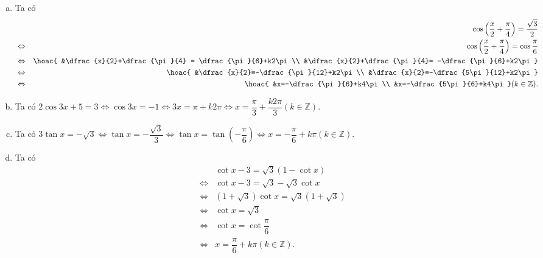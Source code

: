 \begin{ex}
{\begin{enumerate}[a)]
\begin{eqnarray*}
				      &\Leftrightarrow&
				      \hoac{&x=-\dfrac{5}{36}+\dfrac{k2\pi}{3}\\
					      &x=\dfrac{11\pi}{36}+\dfrac{k2\pi}{3}} (k\in \mathbb{Z}).
			      \end{eqnarray*}
			\item Ta có
			      \begin{eqnarray*}
				      &&\cos \left(\dfrac{x}{2}+\dfrac{\pi}{4}\right) =\dfrac{\sqrt{3}}{2} \\ &\Leftrightarrow& \cos \left(\dfrac{x}{2}+\dfrac{\pi}{4}\right)=\cos \dfrac{\pi}{6}\\
				      &\Leftrightarrow& \hoac{
					      &\dfrac{x}{2}+\dfrac{\pi}{4} = \dfrac{\pi}{6}+k2\pi\\
					      &\dfrac{x}{2}+\dfrac{\pi}{4}= -\dfrac{\pi}{6}+k2\pi}\\
				      &\Leftrightarrow&
				      \hoac{
					      &\dfrac{x}{2}=-\dfrac{\pi}{12}+k2\pi\\
					      &\dfrac{x}{2}=-\dfrac{5\pi}{12}+k2\pi}\\
				      &\Leftrightarrow&
				      \hoac{
					      &x=-\dfrac{\pi}{6}+k4\pi\\
					      &x=-\dfrac{5\pi}{6}+k4\pi} (k\in \mathbb{Z}).
			      \end{eqnarray*}
			\item Ta có $2\cos 3x+5=3 \Leftrightarrow \cos 3x =-1 \Leftrightarrow 3x=\pi+k2\pi \Leftrightarrow x = \dfrac{\pi}{3}+\dfrac{k2\pi}{3}(k\in \mathbb{Z})$.
			\item Ta có $3\tan x=-\sqrt{3} \Leftrightarrow \tan x =-\dfrac{\sqrt{3}}{3} \Leftrightarrow
				      \tan x=\tan \left(-\dfrac{\pi}{6}\right) \Leftrightarrow x=-\dfrac{\pi}{6}+k\pi (k\in \mathbb{Z}).$
			\item Ta có
			      \begin{eqnarray*}
				      &&\cot x-3=\sqrt{3}\left(1-\cot x\right)\\
				      &\Leftrightarrow& \cot x-3 =\sqrt{3}-\sqrt{3}\cot x\\
				      &\Leftrightarrow& (1+\sqrt{3})\cot x=\sqrt{3}(1+\sqrt{3})\\
				      &\Leftrightarrow& \cot x=\sqrt{3}\\
				      &\Leftrightarrow& \cot x=\cot \dfrac{\pi}{6}\\
				      &\Leftrightarrow& x=\dfrac{\pi}{6}+k\pi (k\in \mathbb{Z}).
			      \end{eqnarray*}
		\end{enumerate}
	}
\end{ex}

